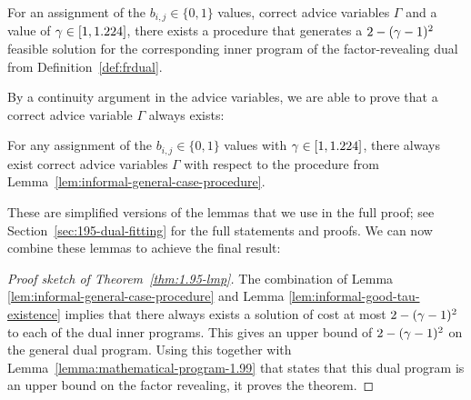 
\begin{lemma}\label{lem:informal-general-case-procedure}
    For an assignment of the $b_{i,j}\in\{0,1\}$ values, correct advice variables $\Gamma$ and a value of $\gamma\in[1,1.224]$, there exists a procedure that generates a $2-(\gamma-1)^2$ feasible solution for the corresponding inner program of the factor-revealing dual from Definition~\ref{def:frdual}.
\end{lemma}

By a continuity argument in the advice variables, we are able to prove that a correct advice variable $\Gamma$ always exists:

\begin{lemma}\label{lem:informal-good-tau-existence}
    For any assignment of the $b_{i,j}\in\{0,1\}$ values with $\gamma\in[1,1.224]$, there always exist correct advice variables $\Gamma$ with respect to the procedure from Lemma~\ref{lem:informal-general-case-procedure}.
\end{lemma}

These are simplified versions of the lemmas that we use in the full proof; see Section~\ref{sec:195-dual-fitting} for the full statements and proofs. We can now combine these lemmas to achieve the final result:

\begin{proof}[Proof sketch of Theorem~\ref{thm:1.95-lmp}]
    The combination of Lemma \ref{lem:informal-general-case-procedure} and Lemma \ref{lem:informal-good-tau-existence} implies that there always exists a solution of cost at most $2-(\gamma-1)^2$ to each of the dual inner programs. This gives an upper bound of $2-(\gamma-1)^2$ on the general dual program. Using this together with Lemma~\ref{lemma:mathematical-program-1.99} that states that this dual program is an upper bound on the factor revealing, it proves the theorem.
\end{proof}
